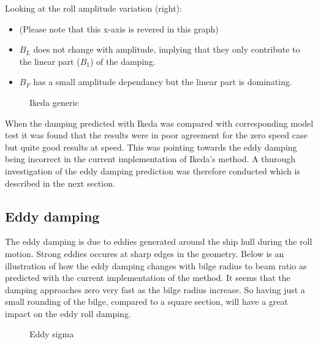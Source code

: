 Looking at the roll amplitude variation (right):

\begin{itemize}
\item (Please note that this x-axis is revered in this graph)
\item $B_L$ does not change with amplitude, implying that they only contribute to the linear part ($B_1$) of the damping.
\item $B_F$ has a small amplitude dependancy but the linear part is dominating.
\end{itemize}

    \begin{figure}
        \begin{center}\end{center}
        \caption{Ikeda generic}
        \label{fig:ikeda_generic}
    \end{figure}
    
    When the damping predicted with Ikeda was compared with corresponding
model test it was found that the results were in poor agreement for the
zero speed case but quite good results at speed. This was pointing
towards the eddy damping being incorrect in the current implementation
of Ikeda's method. A thurough investigation of the eddy damping
prediction was therefore conducted which is described in the next
section.

    \subsection{Eddy damping}\label{eddy-damping}

The eddy damping is due to eddies generated around the ship hull during
the roll motion. Strong eddies occures at sharp edges in the geometry.
Below is an illustration of how the eddy damping changes with bilge
radius to beam ratio as predicted with the current implementation of the
method. It seems that the damping approaches zero very fast as the bilge
radius increase. So having just a small rounding of the bilge, compared
to a square section, will have a great impact on the eddy roll damping.

    \begin{figure}
        \begin{center}\end{center}
        \caption{Eddy sigma}
        \label{fig:eddy_sigma}
    \end{figure}
    

